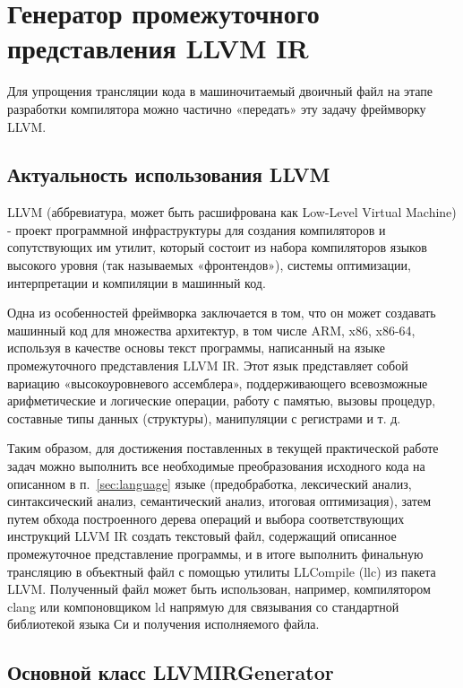 \newpage
\section{Генератор промежуточного представления LLVM IR}
\label{sec:llvmir_codegen}

Для упрощения трансляции кода в машиночитаемый двоичный файл на этапе разработки компилятора можно частично «передать» эту задачу фреймворку LLVM.

\subsection{Актуальность использования LLVM}

LLVM (аббревиатура, может быть расшифрована как Low-Level Virtual Machine) - проект программной инфраструктуры для создания компиляторов и сопутствующих им утилит, который состоит из набора компиляторов языков высокого уровня (так называемых «фронтендов»), системы оптимизации, интерпретации и компиляции в машинный код.

Одна из особенностей фреймворка заключается в том, что он может создавать машинный код для множества архитектур, в том числе ARM, x86, x86-64, используя в качестве основы текст программы, написанный на языке промежуточного представления LLVM IR.
Этот язык представляет собой вариацию «высокоуровневого ассемблера», поддерживающего всевозможные арифметические и логические операции, работу с памятью, вызовы процедур, составные типы данных (структуры), манипуляции с регистрами и т. д.

Таким образом, для достижения поставленных в текущей практической работе задач можно выполнить все необходимые преобразования исходного кода на описанном в п.~\ref{sec:language} языке (предобработка, лексический анализ, синтаксический анализ, семантический анализ, итоговая оптимизация), затем путем обхода построенного дерева операций и выбора соответствующих инструкций LLVM IR создать текстовый файл, содержащий описанное промежуточное представление программы, и в итоге выполнить финальную трансляцию в объектный файл с помощью утилиты LLCompile (llc) из пакета LLVM.
Полученный файл может быть использован, например, компилятором clang или компоновщиком ld напрямую для связывания со стандартной библиотекой языка Си и получения исполняемого файла.

\subsection{Основной класс LLVMIRGenerator}

